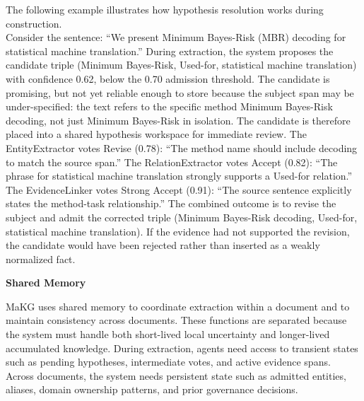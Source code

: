 The following example illustrates how hypothesis resolution works during
construction.\\
Consider the sentence: ``We present Minimum Bayes-Risk (MBR) decoding
for statistical machine translation.'' During extraction, the system
proposes the candidate triple (Minimum Bayes-Risk, Used-for, statistical
machine translation) with confidence 0.62, below the 0.70 admission
threshold. The candidate is promising, but not yet reliable enough to
store because the subject span may be under-specified: the text refers
to the specific method Minimum Bayes-Risk decoding, not just Minimum
Bayes-Risk in isolation. The candidate is therefore placed into a shared
hypothesis workspace for immediate review. The EntityExtractor votes
Revise (0.78): ``The method name should include decoding to match the
source span.'' The RelationExtractor votes Accept (0.82): ``The phrase
for statistical machine translation strongly supports a Used-for
relation.'' The EvidenceLinker votes Strong Accept (0.91): ``The source
sentence explicitly states the method-task relationship.'' The combined
outcome is to revise the subject and admit the corrected triple (Minimum
Bayes-Risk decoding, Used-for, statistical machine translation). If the
evidence had not supported the revision, the candidate would have been
rejected rather than inserted as a weakly normalized fact.

\textbf{Shared Memory}

MaKG uses shared memory to coordinate extraction within a document and
to maintain consistency across documents. These functions are separated
because the system must handle both short-lived local uncertainty and
longer-lived accumulated knowledge. During extraction, agents need
access to transient states such as pending hypotheses, intermediate
votes, and active evidence spans. Across documents, the system needs
persistent state such as admitted entities, aliases, domain ownership
patterns, and prior governance decisions.

